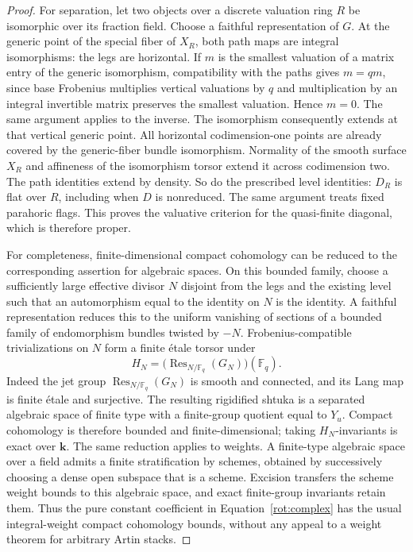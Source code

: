 \begin{proof}
For separation, let two objects over a discrete valuation ring $R$ be
isomorphic over its fraction field.  Choose a faithful representation
of $G$.  At the generic point of the special fiber of $X_R$, both path
maps are integral isomorphisms: the legs are horizontal.  If $m$ is the
smallest valuation of a matrix entry of the generic isomorphism,
compatibility with the paths gives $m=qm$, since base Frobenius
multiplies vertical valuations by $q$ and multiplication by an integral
invertible matrix preserves the smallest valuation.  Hence $m=0$.
The same argument applies to the inverse.  The isomorphism consequently
extends at that vertical generic point.  All horizontal codimension-one
points are already covered by the generic-fiber bundle isomorphism.
Normality of the smooth surface $X_R$ and affineness of the isomorphism
torsor extend it across codimension two.  The path identities extend by
density.  So do the prescribed level identities: $D_R$ is flat over
$R$, including when $D$ is nonreduced.  The same argument treats fixed
parahoric flags.  This proves the valuative criterion for the
quasi-finite diagonal, which is therefore proper.

For completeness, finite-dimensional compact cohomology can be reduced
to the corresponding assertion for algebraic spaces.  On this bounded
family, choose a sufficiently large effective divisor $N$ disjoint
from the legs and the existing level such that an automorphism equal to the identity on $N$
is the identity.  A faithful representation reduces this to the
uniform vanishing of sections of a bounded family of endomorphism
bundles twisted by $-N$.  Frobenius-compatible trivializations on $N$
form a finite \'etale torsor under
\[
 H_N=\bigl(\operatorname{Res}_{N/\mathbb F_q}(G_N)\bigr)(\mathbb F_q).
\]
Indeed the jet group $\operatorname{Res}_{N/\mathbb F_q}(G_N)$ is smooth
and connected, and its Lang map is finite \'etale and surjective.
The resulting rigidified shtuka is a separated algebraic space of
finite type with a finite-group quotient equal to $Y_u$.  Compact
cohomology is therefore bounded and finite-dimensional; taking
$H_N$-invariants is exact over $\mathbf k$.  The same reduction applies
to weights.  A finite-type algebraic space over a field admits a finite
stratification by schemes, obtained by successively choosing a dense
open subspace that is a scheme.  Excision transfers the scheme weight
bounds to this algebraic space, and exact finite-group invariants retain
them.  Thus the pure constant coefficient in
Equation~\eqref{rot:complex} has the usual integral-weight compact
cohomology bounds, without any appeal to a weight theorem for arbitrary
Artin stacks.


\end{proof}

